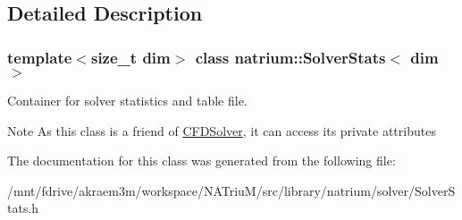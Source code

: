 \subsection{Detailed Description}
\subsubsection*{template$<$size\_\-t dim$>$ class natrium::SolverStats$<$ dim $>$}

Container for solver statistics and table file. \begin{DoxyNote}{Note}
As this class is a friend of \hyperlink{classnatrium_1_1CFDSolver}{CFDSolver}, it can access its private attributes 
\end{DoxyNote}


The documentation for this class was generated from the following file:\begin{DoxyCompactItemize}
\item 
/mnt/fdrive/akraem3m/workspace/NATriuM/src/library/natrium/solver/SolverStats.h\end{DoxyCompactItemize}

